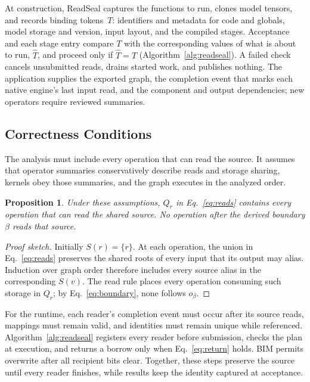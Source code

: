 \documentclass[conference]{IEEEtran}
\newtheorem{proposition}{Proposition}
\begin{document}
At construction, ReadSeal captures the functions to run, clones model tensors, and records binding tokens~$T$: identifiers and metadata for code and globals, model storage and version, input layout, and the compiled stages. Acceptance and each stage entry compare $T$ with the corresponding values of what is about to run, $\hat T$, and proceed only if $\hat T=T$ (Algorithm~\ref{alg:readseal}). A failed check cancels unsubmitted reads, drains started work, and publishes nothing. The application supplies the exported graph, the completion event that marks each native engine's last input read, and the component and output dependencies; new operators require reviewed summaries.

\subsection{Correctness Conditions}
\label{sec:correctness}

The analysis must include every operation that can read the source. It assumes that operator summaries conservatively describe reads and storage sharing, kernels obey those summaries, and the graph executes in the analyzed order.

\begin{proposition}
Under these assumptions, $Q_r$ in Eq.~\eqref{eq:reads} contains every operation that can read the shared source. No operation after the derived boundary $\beta$ reads that source.
\end{proposition}

\begin{proof}[Proof sketch]
Initially $S(r)=\{r\}$. At each operation, the union in Eq.~\eqref{eq:reads} preserves the shared roots of every input that its output may alias. Induction over graph order therefore includes every source alias in the corresponding $S(v)$. The read rule places every operation consuming such storage in $Q_r$; by Eq.~\eqref{eq:boundary}, none follows $o_\beta$.
\end{proof}

For the runtime, each reader's completion event must occur after its source reads, mappings must remain valid, and identities must remain unique while referenced. Algorithm~\ref{alg:readseal} registers every reader before submission, checks the plan at execution, and returns a borrow only when Eq.~\eqref{eq:return} holds. BIM permits overwrite after all recipient bits clear. Together, these steps preserve the source until every reader finishes, while results keep the identity captured at acceptance.
\end{document}
